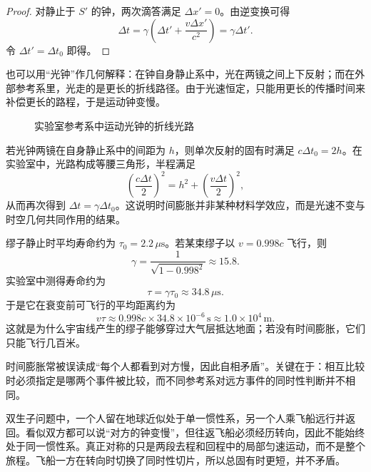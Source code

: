 \begin{proof}
对静止于 $S'$ 的钟，两次滴答满足 $\Delta x'=0$。由逆变换可得
\[
\Delta t=\gamma\left(\Delta t'+\frac{v\Delta x'}{c^2}\right)=\gamma\Delta t'.
\]
令 $\Delta t' = \Delta t_0$ 即得。
\end{proof}

也可以用“光钟”作几何解释：在钟自身静止系中，光在两镜之间上下反射；而在外部参考系里，光走的是更长的折线路径。由于光速恒定，只能用更长的传播时间来补偿更长的路程，于是运动钟变慢。

\begin{figure}[H]
\centering
{}
\caption{实验室参考系中运动光钟的折线光路}
\end{figure}

若光钟两镜在自身静止系中的间距为 $h$，则单次反射的固有时满足 $c\Delta t_0=2h$。在实验室中，光路构成等腰三角形，半程满足
\[
\left(\frac{c\Delta t}{2}\right)^2=h^2+\left(\frac{v\Delta t}{2}\right)^2,
\]
从而再次得到 $\Delta t=\gamma\Delta t_0$。这说明时间膨胀并非某种材料学效应，而是光速不变与时空几何共同作用的结果。

\begin{example}[高空缪子的寿命]
缪子静止时平均寿命约为 $\tau_0=2.2\,\mu\mathrm{s}$。若某束缪子以 $v=0.998c$ 飞行，则
\[
\gamma=\frac{1}{\sqrt{1-0.998^2}}\approx 15.8.
\]
实验室中测得寿命约为
\[
\tau=\gamma\tau_0\approx 34.8\,\mu\mathrm{s}.
\]
于是它在衰变前可飞行的平均距离约为
\[
v\tau\approx 0.998c\times 34.8\times 10^{-6}\,\mathrm{s}\approx 1.0\times 10^4\,\mathrm{m}.
\]
这就是为什么宇宙线产生的缪子能够穿过大气层抵达地面；若没有时间膨胀，它们只能飞行几百米。
\end{example}

时间膨胀常被误读成“每个人都看到对方慢，因此自相矛盾”。关键在于：相互比较时必须指定是哪两个事件被比较，而不同参考系对远方事件的同时性判断并不相同。

\begin{remark}[双生子佯谬的实质]
双生子问题中，一个人留在地球近似处于单一惯性系，另一个人乘飞船远行并返回。看似双方都可以说“对方的钟变慢”，但往返飞船必须经历转向，因此不能始终处于同一惯性系。真正对称的只是两段去程和回程中的局部匀速运动，而不是整个旅程。飞船一方在转向时切换了同时性切片，所以总固有时更短，并不矛盾。
\end{remark}

